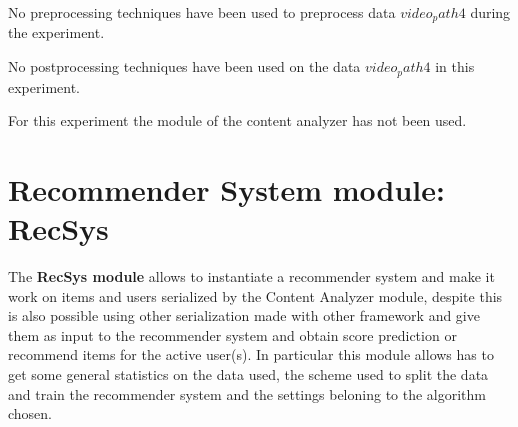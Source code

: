 \documentclass[11pt]{article}
\begin{document}
No preprocessing techniques have been used to preprocess data $ video_path4 $ during the experiment.
\hfill\break
\hfill\break
{}



No postprocessing techniques have been used on the data $ video_path4 $ in this experiment.
\hfill\break
\hfill\break
{}



For this experiment the module of the content analyzer has not been used.
\hfill\break
\hfill\break



\section{Recommender System module: RecSys}\label{sec:recsys}
The \textbf{RecSys module} allows to instantiate a recommender system and make it work on items and users serialized
by the Content Analyzer module, despite this is also possible using other serialization made with other framework and
give them as input to the recommender system and obtain score prediction or recommend items for the active user(s).
In particular this module allows has to get some general statistics on the data used, the scheme used to split the data
and train the recommender system and the settings beloning to the algorithm chosen.
\hfill\break
\hfill\break
\end{document}
